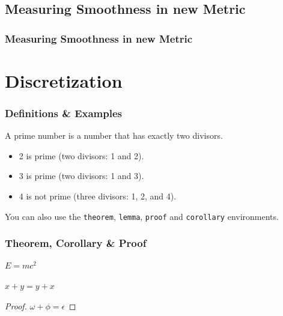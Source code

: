 \documentclass[
	11pt, %
	aspectratio=169, %
]{beamer}
\begin{document}

\subsection{Measuring Smoothness in new Metric}

\begin{frame}
	\frametitle{Measuring Smoothness in new Metric}
	
	
\end{frame}


\section{Discretization}

\begin{frame}
	\frametitle{Definitions \& Examples}
	
	\begin{definition}
		A \alert{prime number} is a number that has exactly two divisors.
	\end{definition}
	
	\smallskip %
	
	\begin{example}
		\begin{itemize}
			\item 2 is prime (two divisors: 1 and 2).
			\item 3 is prime (two divisors: 1 and 3).
			\item 4 is not prime (\alert{three} divisors: 1, 2, and 4).
		\end{itemize}
	\end{example}
	
	\smallskip %
	
	You can also use the \texttt{theorem}, \texttt{lemma}, \texttt{proof} and \texttt{corollary} environments.
\end{frame}


\begin{frame}
	\frametitle{Theorem, Corollary \& Proof}
	
	\begin{theorem}
		$E = mc^2$
	\end{theorem}
	
	\begin{corollary}
		$x + y = y + x$
	\end{corollary}
	
	\begin{proof}
		$\omega + \phi = \epsilon$
	\end{proof}
\end{frame}
\end{document}
